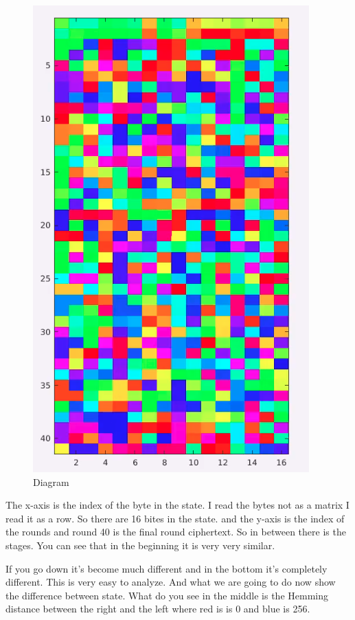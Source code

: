 \begin{figure}[!ht]
\centering
\includegraphics[scale=0.35]{images/Lecture_5/aes_mat_out.png}
\caption{Diagram}\label{fig:Diagram}
\end{figure}

The x-axis is the index of the byte in the state. I read the bytes not as a
matrix I read it as a row. So there are 16 bites in the state. and the y-axis is
the index of the rounds and round 40 is the final round ciphertext. So in
between there is the stages. You can see that in the beginning it is very very
similar.

If you go down it's become much different and in the bottom it's completely
different. This is very easy to analyze. And what we are going to do now show
the difference between state. What do you see in the middle is the Hemming
distance between the right and the left where red is is 0 and blue is 256.

